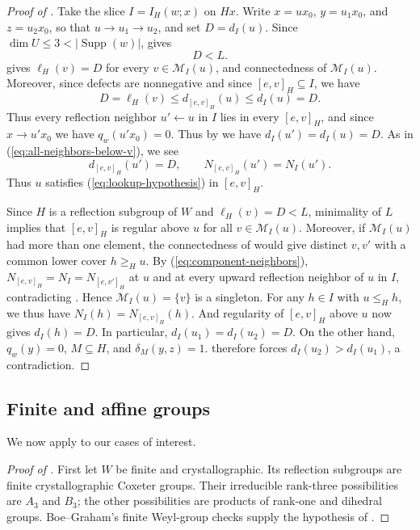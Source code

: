 \documentclass[11pt]{amsart}
\theoremstyle{definition}
\theoremstyle{remark}
\numberwithin{equation}{section}
\DeclareMathOperator{\supp}{Supp}
\begin{document}
\begin{proof}[Proof of ]
Take the slice $I=I_H(w;x)$ on $Hx$. Write
$x=ux_0$, $y=u_1x_0$, and $z=u_2x_0$, so that $u\to u_1\to u_2$, and set $D=d_I(u)$. Since $\dim{U} \leq 3 < |\supp(w)|$,  gives
\begin{equation}\label{eq:induction-decrease}
 D<L.
\end{equation}
 gives
$\ell_H(v)=D$ for every $v\in\mathcal M_I(u)$, and
connectedness of $\mathcal M_I(u)$. Moreover, since defects are nonnegative \cite{DyerDeodhar} and since $[e,v]_H \subseteq I$, we have
\begin{equation}
\label{eq:all-neighbors-below-v}
D=\ell_H(v)\le d_{[e,v]_H}(u)\le d_I(u)=D.
\end{equation}
Thus every reflection neighbor $u'\leftarrow u$ in $I$ lies in
every $[e,v]_H$, and since $x \to u'x_0$ we have $q_w(u'x_0)=0$. Thus by  we have $d_I(u')=d_I(u)=D$.
As in (\ref{eq:all-neighbors-below-v}), we see
\begin{equation}\label{eq:component-neighbors}
 d_{[e,v]_H}(u')=D,\qquad
 N_{[e,v]_H}(u')=N_I(u').
\end{equation}
Thus $u$ satisfies (\ref{eq:lookup-hypothesis}) in $[e,v]_H$.

Since $H$ is a reflection subgroup of $W$ and $\ell_H(v)=D<L$, minimality of $L$ implies that $[e,v]_H$ is regular above $u$ for all $v \in \mathcal M_I(u)$. Moreover, if $\mathcal M_I(u)$ had more than one element, the connectedness of  would give distinct $v,v'$ with a common lower cover $h\ge_Hu$. By (\ref{eq:component-neighbors}),
$N_{[e,v]_H}=N_I=N_{[e,v']_H}$ at $u$ and at every upward
reflection neighbor of $u$ in $I$, contradicting . Hence $\mathcal M_I(u)=\{v\}$ is a singleton. For any $h\in I$ with $u\le_Hh$, we thus have $N_I(h)=N_{[e,v]_H}(h)$. And regularity of $[e,v]_H$ above $u$ now gives $d_I(h)=D$. In particular, 
$d_I(u_1)=d_I(u_2)=D$. On the other hand, $q_w(y)=0$, $M\subseteq H$, and $\delta_M(y,z)=1$.  therefore forces $d_I(u_2)>d_I(u_1)$, a contradiction. 
\end{proof}

\subsection{Finite and affine groups}\label{sec:corollaries}

We now apply  to our cases of interest.

\begin{proof}[Proof of ]
First let $W$ be finite and crystallographic. Its reflection
subgroups are finite crystallographic Coxeter groups. Their
irreducible rank-three possibilities are $A_3$ and $B_3$;
the other possibilities are products of rank-one and dihedral
groups. Boe--Graham's finite Weyl-group checks \cite[p.~319]{BG} supply
the hypothesis of .
\end{proof}
\end{document}
